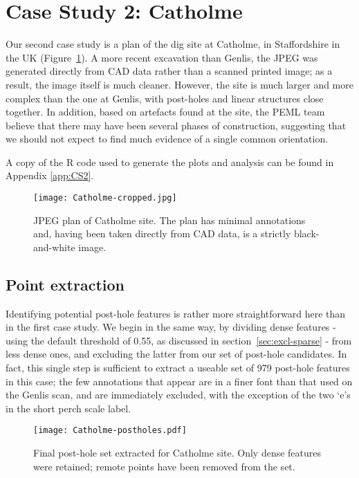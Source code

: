 \documentclass[../../ArchStats.tex]{subfiles}
\begin{document}
\section{Case Study 2: Catholme}
\label{sec:CS2}

Our second case study is a plan of the dig site at Catholme, in Staffordshire in the UK (Figure~\ref{fig:Cat-plan}). A more recent excavation than Genlis, the JPEG was generated directly from CAD data rather than a scanned printed image; as a result, the image itself is much cleaner. However, the site is much larger and more complex than the one at Genlis, with post-holes and linear structures close together. In addition, based on artefacts found at the site, the PEML team believe that there may have been several phases of construction, suggesting that we should not expect to find much evidence of a single common orientation.

A copy of the R code used to generate the plots and analysis can be found in Appendix \ref{app:CS2}.

 \begin{figure}[!ht]
 \caption{JPEG plan of Catholme site. The plan has minimal annotations and, having been taken directly from CAD data, is a strictly black-and-white image.}
 \label{fig:Cat-plan}
 \centering
 \texttt{[image: Catholme-cropped.jpg]}
\end{figure}


 
\subsection{Point extraction}
Identifying potential post-hole features is rather more straightforward here than in the first case study. We begin in the same way, by dividing dense features - using the default threshold of 0.55, as discussed in section~\ref{sec:excl-sparse} - from less dense ones, and excluding the latter from our set of post-hole candidates. In fact, this single step is sufficient to extract a useable set of 979 post-hole features in this case; the few annotations that appear are in a finer font than that used on the Genlis scan, and are immediately excluded, with the exception of the two `e's in the short perch scale label.

	\begin{figure}[!ht]
	\caption{Final post-hole set extracted for Catholme site. Only dense features were retained; remote points have been removed from the set.}
	\label{fig:Catholme-f-ext-postholes}
	\centering
	\texttt{[image: Catholme-postholes.pdf]}
 \end{figure}
 
\end{document}
